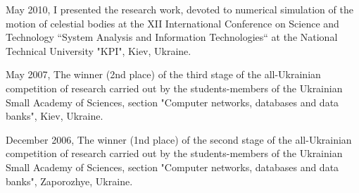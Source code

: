\documentclass[helvetica,openbib,nologo,notitle,totpages]{europecv}
\begin{document}
\begin{europecv}
{\begin{list}{\textbullet}{}
	\item May 2010, I presented the research work, devoted to numerical simulation of the motion of celestial bodies at the XII International Conference on Science and Technology “System	Analysis and Information Technologies“ at the National Technical University "KPI", Kiev, Ukraine.
	
	\item May 2007, The winner (2nd place) of the third stage of the all-Ukrainian competition of research carried out by the students-members of the Ukrainian Small Academy of Sciences, section "Computer networks, databases and data banks", Kiev, Ukraine.
	
	\item December 2006, The winner (1nd place) of the second stage of the all-Ukrainian competition of research carried out by the students-members of the Ukrainian Small Academy of Sciences, section "Computer networks, databases and data banks", Zaporozhye, Ukraine.	
	
\end{list}
}





\end{europecv}
\end{document}
